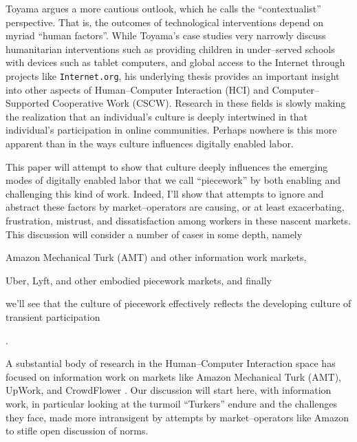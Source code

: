 \documentclass[11pt]{article}
\begin{document}
Toyama argues a more cautious outlook, which he calls the ``contextualist'' perspective.
That is, the outcomes of technological interventions depend on myriad ``human factors''.
While Toyama's case studies very narrowly discuss humanitarian interventions
such as providing children in under--served schools with devices such as tablet computers,
and global access to the Internet through projects like \texttt{Internet.org},
his underlying thesis provides an important insight into other aspects of Human--Computer Interaction (HCI) and Computer--Supported Cooperative Work (CSCW).
Research in these fields is slowly making the realization that
an individual's culture is deeply intertwined in that individual's participation in online communities.
Perhaps nowhere is this more apparent than in the ways culture influences digitally enabled labor.

This paper will attempt to show that
culture deeply influences the emerging modes of digitally enabled labor that we call ``piecework'' by both enabling and challenging this kind of work.
Indeed, I'll show that attempts to ignore and abstract these factors by market--operators are causing, or at least exacerbating,
frustration,
mistrust,
and dissatisfaction
among workers in these nascent markets.
This discussion will consider a number of cases in some depth, namely
\begin{inlinelist}
  \item Amazon Mechanical Turk (AMT) and other information work markets,
  \item Uber, Lyft, and other embodied piecework markets, and finally
  \item we'll see that the culture of piecework effectively reflects the developing culture of transient participation
\end{inlinelist}.

A substantial body of research in the Human--Computer Interaction space has focused on information work on markets like Amazon Mechanical Turk (AMT), UpWork, and CrowdFlower
\cite{taskSearch,turkopticon,crowdworkFuture,foundry}.
Our discussion will start here, with information work,
in particular looking at the turmoil ``Turkers'' endure and the challenges they face,
made more intransigent by attempts by market--operators like Amazon to stifle open discussion of norms.
\end{document}
